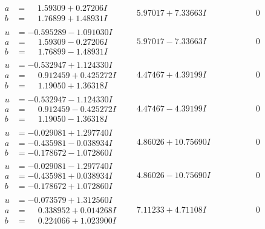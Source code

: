 \documentclass[1p]{elsarticle_modified}
\theoremstyle{definition}
\begin{document}
$$\begin{array}{c|c|c}
\begin{aligned}
a &= \phantom{-}1.59309 + 0.27206 I \\
b &= \phantom{-}1.76899 + 1.48931 I\end{aligned}
 & \phantom{-}5.97017 + 7.33663 I & \phantom{-0.000000 } 0 \\ \hline\begin{aligned}
u &= -0.595289 - 1.091030 I \\
a &= \phantom{-}1.59309 - 0.27206 I \\
b &= \phantom{-}1.76899 - 1.48931 I\end{aligned}
 & \phantom{-}5.97017 - 7.33663 I & \phantom{-0.000000 } 0 \\ \hline\begin{aligned}
u &= -0.532947 + 1.124330 I \\
a &= \phantom{-}0.912459 + 0.425272 I \\
b &= \phantom{-}1.19050 + 1.36318 I\end{aligned}
 & \phantom{-}4.47467 + 4.39199 I & \phantom{-0.000000 } 0 \\ \hline\begin{aligned}
u &= -0.532947 - 1.124330 I \\
a &= \phantom{-}0.912459 - 0.425272 I \\
b &= \phantom{-}1.19050 - 1.36318 I\end{aligned}
 & \phantom{-}4.47467 - 4.39199 I & \phantom{-0.000000 } 0 \\ \hline\begin{aligned}
u &= -0.029081 + 1.297740 I \\
a &= -0.435981 - 0.038934 I \\
b &= -0.178672 - 1.072860 I\end{aligned}
 & \phantom{-}4.86026 + 10.75690 I & \phantom{-0.000000 } 0 \\ \hline\begin{aligned}
u &= -0.029081 - 1.297740 I \\
a &= -0.435981 + 0.038934 I \\
b &= -0.178672 + 1.072860 I\end{aligned}
 & \phantom{-}4.86026 - 10.75690 I & \phantom{-0.000000 } 0 \\ \hline\begin{aligned}
u &= -0.073579 + 1.312560 I \\
a &= \phantom{-}0.338952 + 0.014268 I \\
b &= \phantom{-}0.224066 + 1.023900 I\end{aligned}
 & \phantom{-}7.11233 + 4.71108 I & \phantom{-0.000000 } 0 \\ \hline\begin{aligned}

\end{aligned}
\end{array}$$
\end{document}
